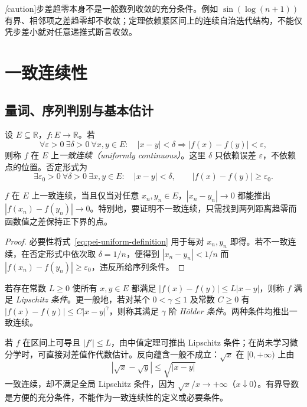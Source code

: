 \emph[caution]{步差趋零本身不是一般数列收敛的充分条件}。例如 $\sin(\log(n+1))$ 有界、相邻项之差趋零却不收敛；定理依赖紧区间上的连续自治迭代结构，不能仅凭步差小就对任意递推式断言收敛。

\section{一致连续性}
\label{sec:pei-uniform-continuity}

\subsection{量词、序列判别与基本估计}

\begin{definition}
设 $E\subseteq\mathbb R$，$f:E\to\mathbb R$。若
\begin{equation}
\label{eq:pei-uniform-definition}
\forall\varepsilon>0\ \exists\delta>0\ \forall x,y\in E:
\quad |x-y|<\delta\Longrightarrow |f(x)-f(y)|<\varepsilon,
\end{equation}
则称 $f$ 在 $E$ 上\emph{一致连续（uniformly continuous）}。这里 $\delta$ 只依赖误差 $\varepsilon$，不依赖点的位置。否定形式为
\[
\exists\varepsilon_0>0\ \forall\delta>0\ \exists x,y\in E:
\quad |x-y|<\delta,\qquad |f(x)-f(y)|\ge\varepsilon_0.
\]
\end{definition}

\begin{proposition}
\label{prop:pei-uniform-sequences}
$f$ 在 $E$ 上一致连续，当且仅当对任意 $x_n,y_n\in E$，$|x_n-y_n|\to0$ 都能推出 $|f(x_n)-f(y_n)|\to0$。特别地，要证明不一致连续，只需找到两列距离趋零而函数值之差保持正下界的点。
\end{proposition}

\begin{proof}
必要性将式~\eqref{eq:pei-uniform-definition} 用于每对 $x_n,y_n$ 即得。若不一致连续，在否定形式中依次取 $\delta=1/n$，便得到 $|x_n-y_n|<1/n$ 而 $|f(x_n)-f(y_n)|\ge\varepsilon_0$，违反所给序列条件。
\end{proof}

\begin{definition}
若存在常数 $L\ge0$ 使所有 $x,y\in E$ 都满足 $|f(x)-f(y)|\le L|x-y|$，则称 $f$ 满足 \emph{Lipschitz 条件}。更一般地，若对某个 $0<\gamma\le1$ 及常数 $C\ge0$ 有 $|f(x)-f(y)|\le C|x-y|^\gamma$，则称其满足 $\gamma$ 阶 \emph{H\"older 条件}。两种条件均推出一致连续。
\end{definition}

若 $f$ 在区间上可导且 $|f'|\le L$，由中值定理可推出 Lipschitz 条件；在尚未学习微分学时，可直接对差值作代数估计。反向蕴含一般不成立：$\sqrt{x}$ 在 $[0,+\infty)$ 上由
\[
|\sqrt{x}-\sqrt{y}|\le\sqrt{|x-y|}
\]
一致连续，却不满足全局 Lipschitz 条件，因为 $\sqrt{x}/x\to+\infty$（$x\downarrow0$）。有界导数是方便的充分条件，不能作为一致连续性的定义或必要条件。

